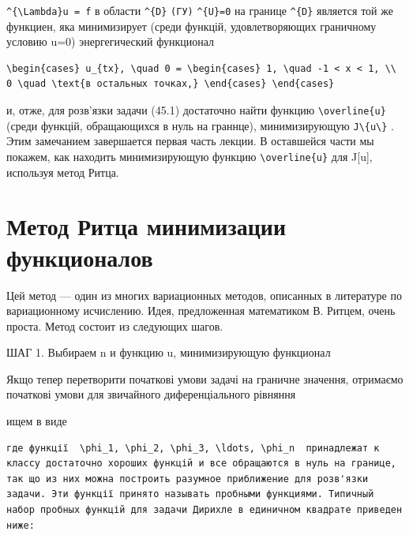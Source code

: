 \documentclass[
  ukrainian,
]{article}
\begin{document}
\texttt{\^{}\{\textbackslash{}Lambda\}u\ =\ f} в области
\texttt{\^{}\{D\}} \texttt{(ГУ)} \texttt{\^{}\{U\}=0} на границе
\texttt{\^{}\{D\}} является той же функциен, яка минимизирует (среди
функцій, удовлетворяющих граничному условию u=0) энергегический
функционал

\begin{verbatim}
\begin{cases} u_{tx}, \quad 0 = \begin{cases} 1, \quad -1 < x < 1, \\ 0 \quad \text{в остальных точках,} \end{cases} \end{cases}
\end{verbatim}

и, отже, для розв'язки задачи (45.1) достаточно найти функцию
\texttt{\textbackslash{}overline\{u\}} (среди функцій, обращающихся в
нуль на граннце), минимизирующую
\texttt{J\textbackslash{}\{u\textbackslash{}\}} . Этим замечанием
завершается первая часть лекции. В оставшейся части мы покажем, как
находить минимизирующую функцию \texttt{\textbackslash{}overline\{u\}}
для J{[}u{]}, используя метод Ритца.

\section{Метод Ритца минимизации
функционалов}\label{ux43cux435ux442ux43eux434-ux440ux438ux442ux446ux430-ux43cux438ux43dux438ux43cux438ux437ux430ux446ux438ux438-ux444ux443ux43dux43aux446ux438ux43eux43dux430ux43bux43eux432}

Цей метод --- один из многих вариационных методов, описанных в
литературе по вариационному исчислению. Идея, предложенная математиком
В. Ритцем, очень проста. Метод состоит из следующих шагов.

ШАГ 1. Выбираем n и функцию u, минимизирующую функционал

Якщо тепер перетворити початкові умови задачі на граничне значення,
отримаємо початкові умови для звичайного диференціального рівняння

ищем в виде

\begin{verbatim}
где функції  \phi_1, \phi_2, \phi_3, \ldots, \phi_n  принадлежат к классу достаточно хороших функцій и все обращаются в нуль на границе, так що из них можна построить разумное приближение для розв'язки задачи. Эти функції принято называть пробными функциями. Типичный набор пробных функцій для задачи Дирихле в единичном квадрате приведен ниже:
\end{verbatim}
\end{document}
